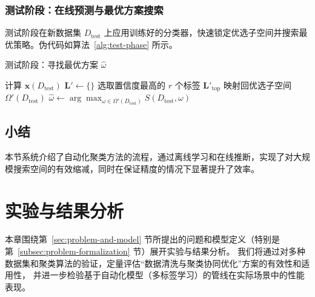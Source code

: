 \documentclass[10pt]{article} %
\numberwithin{equation}{section}
\begin{document}
\subsubsection{测试阶段：在线预测与最优方案搜索}
测试阶段在新数据集 \(D_{\text{test}}\) 上应用训练好的分类器，快速锁定优选子空间并搜索最优策略。伪代码如算法~\ref{alg:test-phase} 所示。

\begin{algorithm}[H]
\caption{测试阶段：寻找最优方案 \(\hat{\omega}\)}
\label{alg:test-phase}

计算 $\mathbf{x}(D_{\text{test}})$\;
$\mathbf{L}' \leftarrow \{\}$\;
选取置信度最高的 $r$ 个标签 $\mathbf{L}'_{\mathrm{top}}$\;
映射回优选子空间 $\Omega'(D_{\text{test}})$\;
$\hat{\omega} \leftarrow \arg\max_{\omega \in \Omega'(D_{\text{test}})}S(D_{\text{test}}, \omega)$\;
\KwRet{$\hat{\omega}$}
\end{algorithm}

\subsection{小结}
本节系统介绍了自动化聚类方法的流程，通过离线学习和在线推断，实现了对大规模搜索空间的有效缩减，同时在保证精度的情况下显著提升了效率。


\section{实验与结果分析}
\label{sec:chapter5}

本章围绕第~\ref{sec:problem-and-model} 节所提出的问题和模型定义（特别是第~\ref{subsec:problem-formalization} 节）展开实验与结果分析。
我们将通过对多种数据集和聚类算法的验证，定量评估“数据清洗与聚类协同优化”方案的有效性和适用性，
并进一步检验基于自动化模型（多标签学习）的管线在实际场景中的性能表现。
\end{document}
